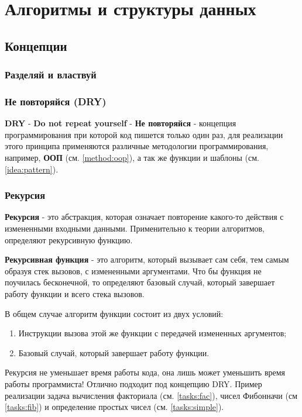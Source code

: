 \part{Алгоритмы и структуры данных}

\chapter{Концепции}

\section{Разделяй и властвуй \label{idea:diff}}
\section{Не повторяйся (DRY) \label{idea:dry}}
\textbf{DRY} - \textbf{Do not repeat yourself} - \textbf{Не повторяйся} - концепция программирования при которой код пишется только один раз, для реализации этого принципа применяются различные методологии программирования, например, \textbf{ООП} (см. \ref{method:oop}), а так же функции и шаблоны (см. \ref{idea:pattern}).

\section{Рекурсия \label{idea:recur}}


\textbf{Рекурсия} - это абстракция, которая означает повторение какого-то действия с измененными входными данными. Применительно к теории алгоритмов, определяют рекурсивную функцию. 

\textbf{Рекурсивная функция} - это алгоритм, который вызывает сам себя, тем самым образуя стек вызовов, с измененными аргументами. Что бы функция не поучилась бесконечной, то определяют базовый случай, который завершает работу функции и всего стека вызовов.

В общем случае алгоритм функции состоит из двух условий:
\begin{enumerate}
\item Инструкции вызова этой же функции с передачей измененных аргументов;
\item Базовый случай, который завершает работу функции.
\end{enumerate}

Рекурсия не уменьшает время работы кода, она лишь может уменьшить время работы программиста! Отлично подходит под концепцию DRY. Пример реализации задача вычисления факториала (см. \ref{tasks:fac}), чисел Фибонначи (см \ref{tasks:fib}) и определение простых чисел (см. \ref{tasks:simple}). 

